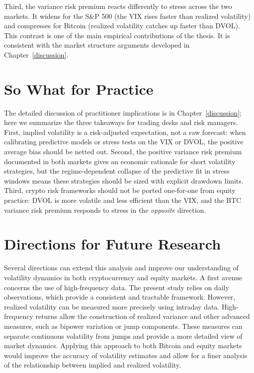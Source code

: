 \documentclass[11pt,a4paper,openany]{report}
\begin{document}
Third, the variance risk premium reacts differently to stress across
the two markets. It widens for the S\&P 500 (the VIX rises faster than
realized volatility) and compresses for Bitcoin (realized volatility
catches up faster than DVOL). This contrast is one of the main
empirical contributions of the thesis. It is consistent with the
market structure arguments developed in Chapter~\ref{discussion}.

\section{So What for Practice}\label{implications-for-practitioners}

The detailed discussion of practitioner implications is in
Chapter~\ref{discussion}; here we summarize the three takeaways for
trading desks and risk managers. First, implied volatility is a
risk-adjusted expectation, not a raw forecast: when calibrating
predictive models or stress tests on the VIX or DVOL, the positive
average bias should be netted out. Second, the positive variance risk
premium documented in both markets gives an economic rationale for short
volatility strategies, but the regime-dependent collapse of the
predictive fit in stress windows means these strategies should be sized
with explicit drawdown limits. Third, crypto risk frameworks should not
be ported one-for-one from equity practice: DVOL is more volatile and
less efficient than the VIX, and the BTC variance risk premium responds
to stress in the \emph{opposite} direction.

\section{Directions for Future
Research}\label{directions-for-future-research}

Several directions can extend this analysis and improve our
understanding of volatility dynamics in both cryptocurrency and equity
markets. A first avenue concerns the use of high-frequency data. The
present study relies on daily observations, which provide a consistent
and tractable framework. However, realized volatility can be measured
more precisely using intraday data. High-frequency returns allow the
construction of realized variance and other advanced measures, such as
bipower variation or jump components. These measures can separate
continuous volatility from jumps and provide a more detailed view of
market dynamics. Applying this approach to both Bitcoin and equity
markets would improve the accuracy of volatility estimates and allow for
a finer analysis of the relationship between implied and realized
volatility.
\end{document}
